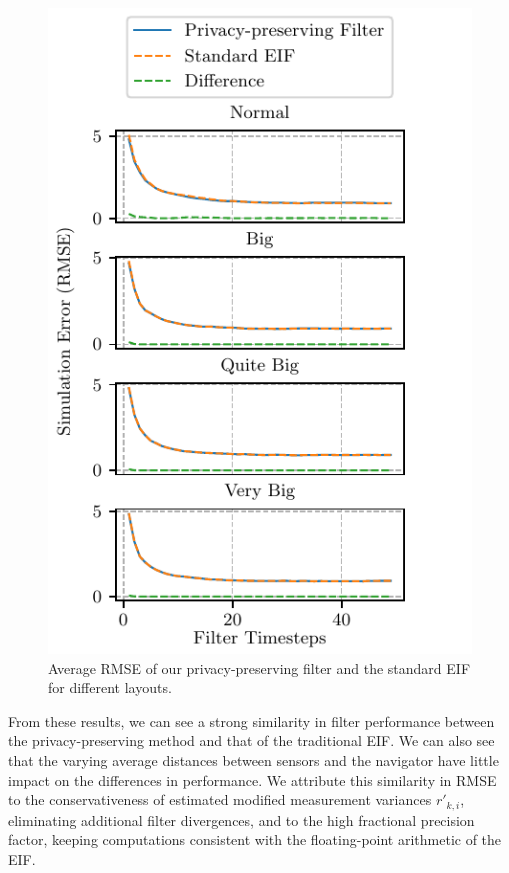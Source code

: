 \documentclass[10pt,letterpaper,oneside,twocolumn,journal]{IEEEtran}
\theoremstyle{definition}
\theoremstyle{definition}
\theoremstyle{remark}
\begin{document}
\begin{figure}[htbp]
    \centering
    \includegraphics{images/layout_errors.pdf}
    \caption{Average RMSE of our privacy-preserving filter and the standard EIF for different layouts.}
    \vspace{-\baselineskip}
    \label{fig:sim_layout_errors}
\end{figure}
From these results, we can see a strong similarity in filter performance between the privacy-preserving method and that of the traditional EIF. We can also see that the varying average distances between sensors and the navigator have little impact on the differences in performance. We attribute this similarity in RMSE to the conservativeness of estimated modified measurement variances $r'_{k,i}$, eliminating additional filter divergences, and to the high fractional precision factor, keeping computations consistent with the floating-point arithmetic of the EIF.
\end{document}
